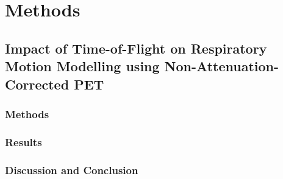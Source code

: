 \chapter{Methods} \label{methods}
    \blindtext
        
    \section{Impact of Time-of-Flight on Respiratory Motion Modelling using Non-Attenuation-Corrected PET} \label{Impact_of_time_of_flight_on_respiratory_motion_modelling_using_non_attenuation_corrected_pet}
        \blindtext
        
        \subsection{Methods} \label{Impact_of_time_of_flight_on_respiratory_motion_modelling_using_non_attenuation_corrected_pet_methods}
            \blindtext
            
        \subsection{Results} \label{Impact_of_time_of_flight_on_respiratory_motion_modelling_using_non_attenuation_corrected_pet_results}
            \blindtext
            
        \subsection{Discussion and Conclusion} \label{Impact_of_time_of_flight_on_respiratory_motion_modelling_using_non_attenuation_corrected_pet_discussion_and_conclusion}
            \blindtext
